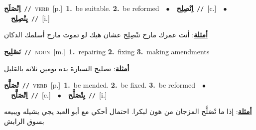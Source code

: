 \documentclass[10pt,a4paper,twoside]{article} %
\begin{document}
\begin{multicols}{2}
{\setlength\topsep{0pt}\textbf{\foreignlanguage{arabic}{اِنْصَلَح}}\ {\color{gray}\texttt{//}\color{black}}\ \textsc{verb}\ [p.]\ \textbf{1.}~be suitable.  \textbf{2.}~be reformed\ \ $\bullet$\ \ \setlength\topsep{0pt}\textbf{\foreignlanguage{arabic}{اِنْصِلِح}}\ {\color{gray}\texttt{//}\color{black}}\ [c.]\ \ $\bullet$\ \ \setlength\topsep{0pt}\textbf{\foreignlanguage{arabic}{يِنْصِلِح}}\ {\color{gray}\texttt{//}\color{black}}\ [i.]\  \begin{flushright}\color{gray}\foreignlanguage{arabic}{\textbf{\underline{\foreignlanguage{arabic}{أمثلة}}}: أنت عمرك مارح تنْصِلِح عشان هيك لو تموت مارح أسلمك الدكان}\end{flushright}\color{black}} \vspace{2mm}

{\setlength\topsep{0pt}\textbf{\foreignlanguage{arabic}{تَصْلِيح}}\ {\color{gray}\texttt{//}\color{black}}\ \textsc{noun}\ [m.]\ \textbf{1.}~repairing  \textbf{2.}~fixing  \textbf{3.}~making amendments\  \begin{flushright}\color{gray}\foreignlanguage{arabic}{\textbf{\underline{\foreignlanguage{arabic}{أمثلة}}}: تصليح السيارة بده يومين ثلاثة بالقليل}\end{flushright}\color{black}} \vspace{2mm}

{\setlength\topsep{0pt}\textbf{\foreignlanguage{arabic}{تْصَلَّح}}\ {\color{gray}\texttt{//}\color{black}}\ \textsc{verb}\ [p.]\ \textbf{1.}~be mended.  \textbf{2.}~be fixed.  \textbf{3.}~be reformed\ \ $\bullet$\ \ \setlength\topsep{0pt}\textbf{\foreignlanguage{arabic}{اِتْصَلَّح}}\ {\color{gray}\texttt{//}\color{black}}\ [c.]\ \ $\bullet$\ \ \setlength\topsep{0pt}\textbf{\foreignlanguage{arabic}{يِتْصَلَّح}}\ {\color{gray}\texttt{//}\color{black}}\ [i.]\  \begin{flushright}\color{gray}\foreignlanguage{arabic}{\textbf{\underline{\foreignlanguage{arabic}{أمثلة}}}: إذا ما تْصَلَّح المزجان من هون لبكرا. احتمال أحكي مع أبو العبد يجي يشيله ويبيعه بسوق الرابش}\end{flushright}\color{black}} \vspace{2mm}


\end{multicols}
\end{document}
